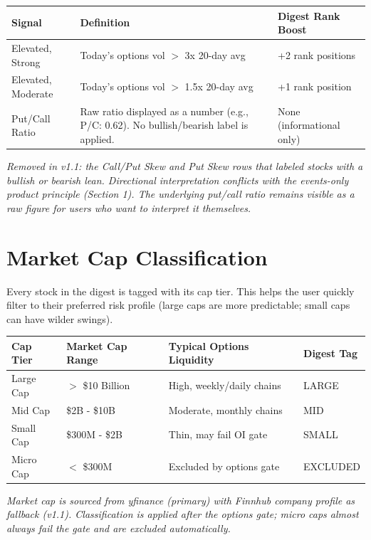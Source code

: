 \documentclass[11pt]{article}
\begin{document}
\begin{tabularx}{\textwidth}{|L{3.4cm}|X|L{3.6cm}|}
\hline
\textbf{Signal} & \textbf{Definition} & \textbf{Digest Rank Boost} \\
\hline
Elevated, Strong & Today's options vol $>$ 3x 20-day avg & +2 rank positions \\
\hline
Elevated, Moderate & Today's options vol $>$ 1.5x 20-day avg & +1 rank position \\
\hline
Put/Call Ratio & Raw ratio displayed as a number (e.g., P/C: 0.62). No bullish/bearish label is applied. & None (informational only) \\
\hline
\end{tabularx}

\textit{Removed in v1.1: the Call/Put Skew and Put Skew rows that labeled stocks with a bullish or bearish lean. Directional interpretation conflicts with the events-only product principle (Section 1). The underlying put/call ratio remains visible as a raw figure for users who want to interpret it themselves.}

\section{Market Cap Classification}

Every stock in the digest is tagged with its cap tier. This helps the user quickly filter to their preferred risk profile (large caps are more predictable; small caps can have wilder swings).

\begin{tabularx}{\textwidth}{|L{2.4cm}|L{3.4cm}|X|L{2.4cm}|}
\hline
\textbf{Cap Tier} & \textbf{Market Cap Range} & \textbf{Typical Options Liquidity} & \textbf{Digest Tag} \\
\hline
Large Cap & $>$ \$10 Billion & High, weekly/daily chains & LARGE \\
\hline
Mid Cap & \$2B - \$10B & Moderate, monthly chains & MID \\
\hline
Small Cap & \$300M - \$2B & Thin, may fail OI gate & SMALL \\
\hline
Micro Cap & $<$ \$300M & Excluded by options gate & EXCLUDED \\
\hline
\end{tabularx}

\textit{Market cap is sourced from yfinance (primary) with Finnhub company profile as fallback (v1.1). Classification is applied after the options gate; micro caps almost always fail the gate and are excluded automatically.}
\end{document}
